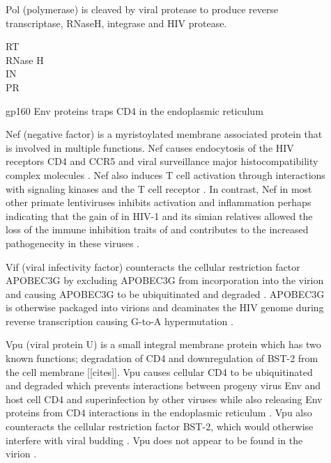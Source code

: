 \documentclass[../sherrill-Mix_thesis.tex]{subfiles}
\begin{document}
\begin{description}
	\item[\pol{}]
		Pol (polymerase) is cleaved by viral protease to produce reverse transcriptase, RNaseH, integrase and HIV protease. 
		\begin{description}
			\item[RT]
			\item[RNase H]
			\item[IN]
			\item[PR]
		\end{description}
	\item[\env{}]
		gp160 Env proteins traps CD4 in the endoplasmic reticulum \citep{Crise1990,Bour1991}
	\item[\tat{}]
	\item[\rev{}]
	\item[\nef{}]
			Nef (negative factor) is a myristoylated membrane associated protein \citep{Yu1992} that is involved in multiple functions. Nef causes endocytosis of the HIV receptors CD4 \citep{Garcia1991,Benson1993,Aiken1994,Lama1999,Ross1999} and CCR5 \citep{Michel2005} and viral surveillance major histocompatibility complex molecules \citep{Schwartz1996,Collins1998,Stumptner-Cuvelette2001,Blagoveshchenskaya2002}. Nef also induces T cell activation through interactions with signaling kinases and the T cell receptor \citep{Xu1999,Schrager1999,Wang2000,Simmons2001,Schrager2002}. In contrast, Nef in most other primate lentiviruses inhibits activation and inflammation \citep{Schindler2006} perhaps indicating that the gain of \vpu{} in HIV-1 and its simian relatives allowed the loss of the immune inhibition traits of \nef{} and contributes to the increased pathogenecity in these viruses \citep{Kirchoff2008,Kirchoff2009}.
	\item[\vpr{}]
	\item[\vif{}]
		Vif (viral infectivity factor) counteracts the cellular restriction factor APOBEC3G \citep{Sheehy2002} by excluding APOBEC3G from incorporation into the virion \citep{Mariani2003} and causing APOBEC3G to be ubiquitinated and degraded \citep{Sheehy2003,Marin2003,Yu2003}. APOBEC3G is otherwise packaged into virions \citep{Harris2003} and deaminates the HIV genome during reverse transcription causing G-to-A hypermutation \citep{Harris2003,Mangeat2003,Zhang2003,Lecossier2003}.
	\item[\vpu{}]
		Vpu (viral protein U) \citep{Cohen1988,Strebel1988} is a small integral membrane protein which has two known functions; degradation of CD4 and downregulation of BST-2 from the cell membrane [[cites]]. Vpu causes cellular CD4 to be ubiquitinated and degraded \citep{Willey1992,Bour1995} which prevents interactions between progeny virus Env and host cell CD4 \citep{Marshall1992,Lama1999,Ross1999,Cortes2002} and superinfection by other viruses \citep{Benson1993}  while also releasing Env proteins from CD4 interactions in the endoplasmic reticulum \citep{Crise1990,Bour1991}. Vpu also counteracts the cellular restriction factor BST-2, which would otherwise interfere with viral budding \citep{Neil2008}. Vpu does not appear to be found in the virion \citep{Strebel1989}.

\end{description}
\end{document}
